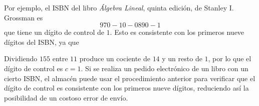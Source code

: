 \begin{adjustwidth}{-7.6cm}{-2cm}
\begin{tcolorbox}
\begin{multicols}{2}
\begin{enumerate}[label=\roman*)]
            \end{enumerate}
            Por ejemplo, el ISBN del libro \emph{Álgebra Lineal}, quinta edición, de Stanley I. Grossman es
            $$970-10-0890-1$$
            que tiene un dígito de control de $1$. Esto es consistente con los primeros nueve dígitos del ISBN, ya que
            \begin{matrizn}
            \end{matrizn}
            Dividiendo $155$ entre $11$ produce un cociente de $14$ y un resto de $1$, por lo que el dígito de control es $c = 1$. Si se realiza un pedido electrónico de un libro con un cierto ISBN, el almacén puede usar el procedimiento anterior para verificar que el dígito de control es consistente con los primeros nueve dígitos, reduciendo así la posibilidad de un costoso error de envío.
        \end{multicols}
    \end{tcolorbox}
\end{adjustwidth}

